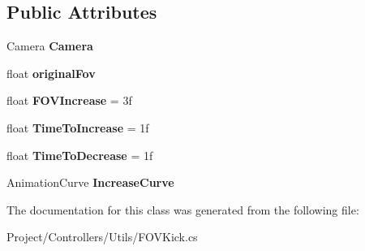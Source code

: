 \subsection*{Public Attributes}
\begin{DoxyCompactItemize}
\item 
\mbox{\label{class_unity_standard_assets_1_1_utility_1_1_f_o_v_kick_a3ae90ba267d5979aa59950ed4f76d78f}} 
Camera {\bfseries Camera}
\item 
\mbox{\label{class_unity_standard_assets_1_1_utility_1_1_f_o_v_kick_a4969e492fb48a6d65f9d022b4b5b3b50}} 
float {\bfseries original\+Fov}
\item 
\mbox{\label{class_unity_standard_assets_1_1_utility_1_1_f_o_v_kick_a000532bb540999d880107469e14b1d61}} 
float {\bfseries F\+O\+V\+Increase} = 3f
\item 
\mbox{\label{class_unity_standard_assets_1_1_utility_1_1_f_o_v_kick_abe3ae5ad6ab9e75ed866ed84b20aa1ba}} 
float {\bfseries Time\+To\+Increase} = 1f
\item 
\mbox{\label{class_unity_standard_assets_1_1_utility_1_1_f_o_v_kick_a5624579aac52e515f99d244c73852e73}} 
float {\bfseries Time\+To\+Decrease} = 1f
\item 
\mbox{\label{class_unity_standard_assets_1_1_utility_1_1_f_o_v_kick_a17f2bd98b1e8913e420b8032ff94c6cc}} 
Animation\+Curve {\bfseries Increase\+Curve}
\end{DoxyCompactItemize}


The documentation for this class was generated from the following file\+:\begin{DoxyCompactItemize}
\item 
Project/\+Controllers/\+Utils/F\+O\+V\+Kick.\+cs\end{DoxyCompactItemize}
